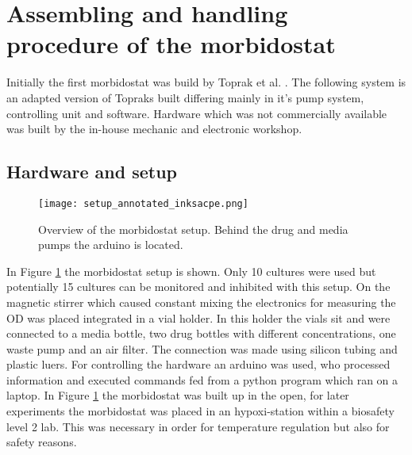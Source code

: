 \section{Assembling and handling procedure of the morbidostat}
Initially the first morbidostat was build by Toprak et al. \cite{morb_toprak}. The following system is an adapted version of Topraks built differing mainly in it's pump system, controlling unit and software. Hardware which was not commercially available was built by the in-house mechanic and electronic workshop.

\subsection{Hardware and setup}

\begin{figure}[H]
	\texttt{[image: setup\_annotated\_inksacpe.png]}
	\caption{Overview of the morbidostat setup. Behind the drug and media pumps the arduino is located.}
	\label{figure:morbidostat_setup}
\end{figure}  
In Figure \ref{figure:morbidostat_setup} the morbidostat setup is shown. Only 10 cultures were used but potentially 15 cultures can be monitored and inhibited with this setup. On the magnetic stirrer which caused constant mixing the electronics for measuring the OD was placed integrated in a vial holder. In this holder the vials sit and were connected to a media bottle, two drug bottles with different concentrations, one waste pump and an air filter. The connection was made using silicon tubing and plastic luers. For controlling the hardware an arduino was used, who processed information and executed commands fed from a python program which ran on a laptop. 
In Figure \ref{figure:morbidostat_setup} the morbidostat was built up in the open, for later experiments the morbidostat was placed in an hypoxi-station within a biosafety level 2 lab. This was necessary in order for temperature regulation but also for safety reasons.  


